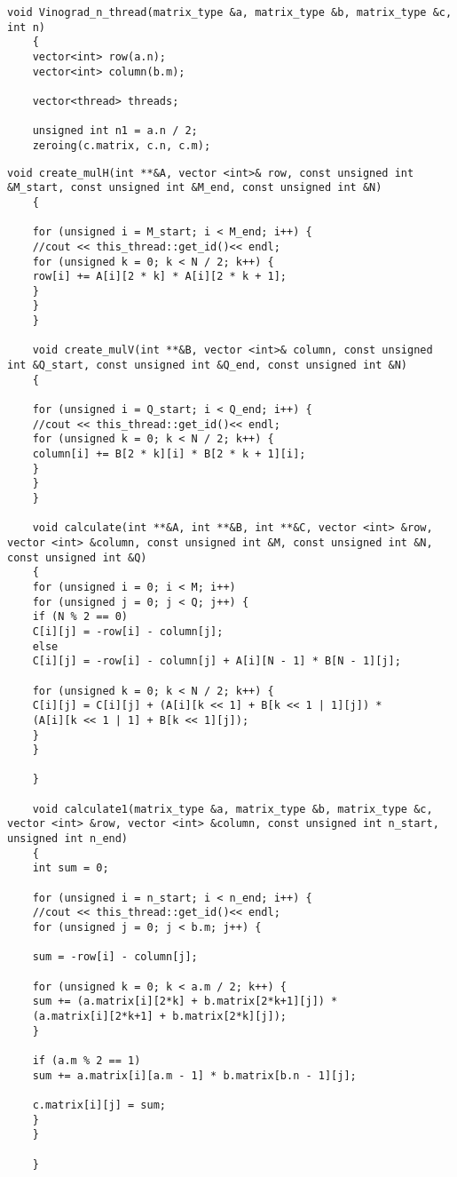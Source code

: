 \documentclass[12pt, a4paper]{report}
\begin{document}
	\begin{lstlisting}[label=code1,caption=Реализация алгоритма Винограда]
	void Vinograd_n_thread(matrix_type &a, matrix_type &b, matrix_type &c, int n)
	{
	vector<int> row(a.n);
	vector<int> column(b.m);
	
	vector<thread> threads;
	
	unsigned int n1 = a.n / 2;
	zeroing(c.matrix, c.n, c.m);
	\end{lstlisting}

	\begin{lstlisting}[label=code2,caption=Основные вычисления для многопоточной реализации алгоритма Винограда]
	void create_mulH(int **&A, vector <int>& row, const unsigned int &M_start, const unsigned int &M_end, const unsigned int &N)
	{
	
	for (unsigned i = M_start; i < M_end; i++) {
	//cout << this_thread::get_id()<< endl;
	for (unsigned k = 0; k < N / 2; k++) {
	row[i] += A[i][2 * k] * A[i][2 * k + 1];
	}
	}
	}
	
	void create_mulV(int **&B, vector <int>& column, const unsigned int &Q_start, const unsigned int &Q_end, const unsigned int &N)
	{
	
	for (unsigned i = Q_start; i < Q_end; i++) {
	//cout << this_thread::get_id()<< endl;
	for (unsigned k = 0; k < N / 2; k++) {
	column[i] += B[2 * k][i] * B[2 * k + 1][i];
	}
	}
	}
	
	void calculate(int **&A, int **&B, int **&C, vector <int> &row, vector <int> &column, const unsigned int &M, const unsigned int &N, const unsigned int &Q)
	{
	for (unsigned i = 0; i < M; i++)
	for (unsigned j = 0; j < Q; j++) {
	if (N % 2 == 0)
	C[i][j] = -row[i] - column[j];
	else
	C[i][j] = -row[i] - column[j] + A[i][N - 1] * B[N - 1][j];
	
	for (unsigned k = 0; k < N / 2; k++) {
	C[i][j] = C[i][j] + (A[i][k << 1] + B[k << 1 | 1][j]) *
	(A[i][k << 1 | 1] + B[k << 1][j]);
	}
	}
	
	}
	
	void calculate1(matrix_type &a, matrix_type &b, matrix_type &c, vector <int> &row, vector <int> &column, const unsigned int n_start, unsigned int n_end)
	{
	int sum = 0;
	
	for (unsigned i = n_start; i < n_end; i++) {
	//cout << this_thread::get_id()<< endl;
	for (unsigned j = 0; j < b.m; j++) {
	
	sum = -row[i] - column[j];
	
	for (unsigned k = 0; k < a.m / 2; k++) {
	sum += (a.matrix[i][2*k] + b.matrix[2*k+1][j]) *
	(a.matrix[i][2*k+1] + b.matrix[2*k][j]);
	}
	
	if (a.m % 2 == 1)
	sum += a.matrix[i][a.m - 1] * b.matrix[b.n - 1][j];
	
	c.matrix[i][j] = sum;
	}
	}
	
	}
	
	\end{lstlisting}
\end{document}
